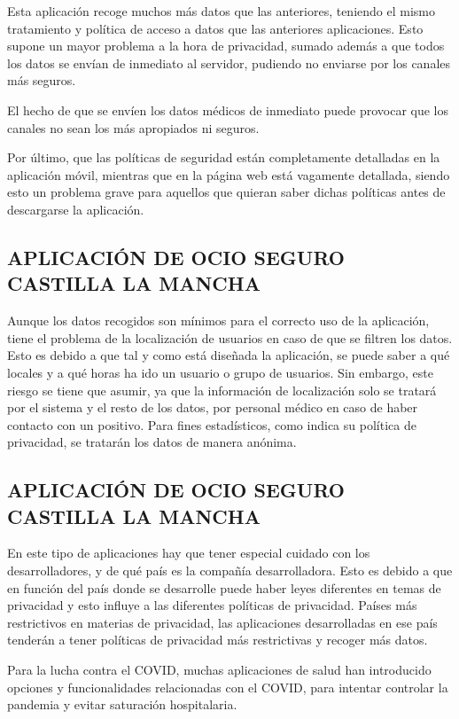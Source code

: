 \documentclass[11pt,a4paper,spanish]{article}
\begin{document}
Esta aplicación recoge muchos más datos que las anteriores, teniendo el mismo tratamiento y política de acceso a datos que las anteriores aplicaciones. Esto supone un mayor problema a la hora de privacidad, sumado además a que todos los datos se envían de inmediato al servidor, pudiendo no enviarse por los canales más seguros.

El hecho de que se envíen los datos médicos de inmediato puede provocar que los canales no sean los más apropiados ni seguros. 

Por último, que las políticas de seguridad están completamente detalladas en la aplicación móvil, mientras que en la página web está vagamente detallada, siendo esto un problema grave para aquellos que quieran saber dichas políticas antes de descargarse la aplicación.

\subsection{APLICACIÓN DE OCIO SEGURO CASTILLA LA MANCHA}

Aunque los datos recogidos son mínimos para el correcto uso de la aplicación, tiene el problema de la localización de usuarios en caso de que se filtren los datos. Esto es debido a que tal y como está diseñada la aplicación, se puede saber a qué locales y a qué horas ha ido un usuario o grupo de usuarios. Sin embargo, este riesgo se tiene que asumir, ya que la información de localización solo se tratará por el sistema y el resto de los datos, por personal médico en caso de haber contacto con un positivo. Para fines estadísticos, como indica su política de privacidad, se tratarán los datos de manera anónima.

\subsection{APLICACIÓN DE OCIO SEGURO CASTILLA LA MANCHA}

En este tipo de aplicaciones hay que tener especial cuidado con los desarrolladores, y de qué país es la compañía desarrolladora. Esto es debido a que en función del país donde se desarrolle puede haber leyes diferentes en temas de privacidad y esto influye a las diferentes políticas de privacidad. Países más restrictivos en materias de privacidad, las aplicaciones desarrolladas en ese país tenderán a tener políticas de privacidad más restrictivas y recoger más datos.

Para la lucha contra el COVID, muchas aplicaciones de salud han introducido opciones y funcionalidades relacionadas con el COVID, para intentar controlar la pandemia y evitar saturación hospitalaria. 
\end{document}
